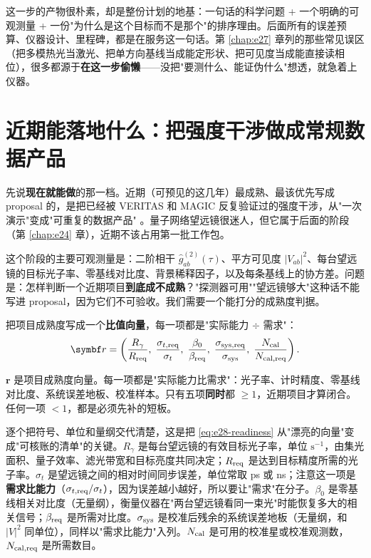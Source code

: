 这一步的产物很朴素，却是整份计划的地基：一句话的科学问题 + 一个明确的可观测量 + 一份"为什么是这个目标而不是那个"的排序理由。后面所有的误差预算、仪器设计、里程碑，都是在服务这一句话。第 \ref{chap:e27} 章列的那些常见误区（把多模热光当激光、把单方向基线当成能定形状、把可见度当成能直接读相位），很多都源于\textbf{在这一步偷懒}——没把"要测什么、能证伪什么"想透，就急着上仪器。

\section{近期能落地什么：把强度干涉做成常规数据产品}
\label{sec:e28-nearterm}

先说\textbf{现在就能做}的那一档。近期（可预见的这几年）最成熟、最该优先写成 proposal 的，是把已经被 VERITAS 和 MAGIC 反复验证过的强度干涉，从"一次演示"变成"可重复的数据产品" \citep{2020NatAs...4.1164A,2024MNRAS.529.4387A}。量子网络望远镜很迷人，但它属于后面的阶段（第 \ref{chap:e24} 章），近期不该占用第一批工作包。

这个阶段的主要可观测量是：二阶相干 \(\hat g^{(2)}_{ab}(\tau)\)、平方可见度 \(|V_{ab}|^2\)、每台望远镜的目标光子率、零基线对比度、背景稀释因子，以及每条基线上的协方差。问题是：怎样判断一个近期项目\textbf{到底成不成熟}？"探测器可用""望远镜够大"这种话不能写进 proposal，因为它们不可验收。我们需要一个能打分的成熟度判据。

把项目成熟度写成一个\textbf{比值向量}，每一项都是"实际能力 \(\div\) 需求"：
\begin{equation}
  \bm{r}=
  \left(
  \frac{R_\gamma}{R_{\rm req}},\;
  \frac{\sigma_{t,{\rm req}}}{\sigma_t},\;
  \frac{\beta_0}{\beta_{\rm req}},\;
  \frac{\sigma_{{\rm sys,req}}}{\sigma_{\rm sys}},\;
  \frac{N_{\rm cal}}{N_{{\rm cal,req}}}
  \right).
  \label{eq:e28-readiness}
\end{equation}
\begin{formulaexplain}
\(\bm r\) 是项目成熟度向量。每一项都是"实际能力比需求"：光子率、计时精度、零基线对比度、系统误差地板、校准样本。只有五项\textbf{同时}都 \(\ge1\)，近期项目才算闭合。任何一项 \(<1\)，都是必须先补的短板。
\end{formulaexplain}
逐个把符号、单位和量纲交代清楚，这是把 \eqref{eq:e28-readiness} 从"漂亮的向量"变成"可核账的清单"的关键。\(R_\gamma\) 是每台望远镜的有效目标光子率，单位 \(\mathrm{s^{-1}}\)，由集光面积、量子效率、滤光带宽和目标亮度共同决定；\(R_{\rm req}\) 是达到目标精度所需的光子率。\(\sigma_t\) 是望远镜之间的相对时间同步误差，单位常取 ps 或 ns；注意这一项是\textbf{需求比能力}（\(\sigma_{t,{\rm req}}/\sigma_t\)），因为误差越小越好，所以要让"需求"在分子。\(\beta_0\) 是零基线相关对比度（无量纲），衡量仪器在"两台望远镜看同一束光"时能恢复多大的相关信号；\(\beta_{\rm req}\) 是所需对比度。\(\sigma_{\rm sys}\) 是校准后残余的系统误差地板（无量纲，和 \(|V|^2\) 同单位），同样以"需求比能力"入列。\(N_{\rm cal}\) 是可用的校准星或校准观测数，\(N_{\rm cal,req}\) 是所需数目。

